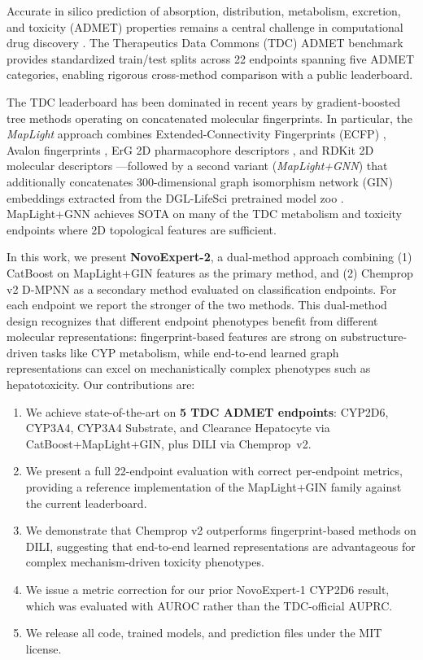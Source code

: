 \documentclass[11pt]{article}
\begin{document}
Accurate in silico prediction of absorption, distribution, metabolism, excretion, and toxicity (ADMET) properties remains a central challenge in computational drug discovery \citep{kola2004can, ferreira2019admet}. The Therapeutics Data Commons (TDC) ADMET benchmark \citep{huang2021therapeutics} provides standardized train/test splits across 22 endpoints spanning five ADMET categories, enabling rigorous cross-method comparison with a public leaderboard.

The TDC leaderboard has been dominated in recent years by gradient-boosted tree methods operating on concatenated molecular fingerprints. In particular, the \emph{MapLight} approach \citep{notwell2023maplight} combines Extended-Connectivity Fingerprints (ECFP) \citep{rogers2010extended}, Avalon fingerprints \citep{gedeck2006qsar}, ErG 2D pharmacophore descriptors \citep{stiefl2006erg}, and RDKit 2D molecular descriptors \citep{landrum2013rdkit}---followed by a second variant (\emph{MapLight+GNN}) that additionally concatenates 300-dimensional graph isomorphism network (GIN) embeddings \citep{xu2019gin, hu2020gin} extracted from the DGL-LifeSci pretrained model zoo \citep{li2021dgllife}. MapLight+GNN achieves SOTA on many of the TDC metabolism and toxicity endpoints where 2D topological features are sufficient.

In this work, we present \textbf{NovoExpert-2}, a dual-method approach combining (1) CatBoost \citep{prokhorenkova2018catboost} on MapLight+GIN features as the primary method, and (2) Chemprop v2 D-MPNN \citep{yang2019analyzing} as a secondary method evaluated on classification endpoints. For each endpoint we report the stronger of the two methods. This dual-method design recognizes that different endpoint phenotypes benefit from different molecular representations: fingerprint-based features are strong on substructure-driven tasks like CYP metabolism, while end-to-end learned graph representations can excel on mechanistically complex phenotypes such as hepatotoxicity. Our contributions are:

\begin{enumerate}
    \item We achieve state-of-the-art on \textbf{5 TDC ADMET endpoints}: CYP2D6, CYP3A4, CYP3A4 Substrate, and Clearance Hepatocyte via CatBoost{+}MapLight{+}GIN, plus DILI via Chemprop~v2.
    \item We present a full 22-endpoint evaluation with correct per-endpoint metrics, providing a reference implementation of the MapLight+GIN family against the current leaderboard.
    \item We demonstrate that Chemprop v2 outperforms fingerprint-based methods on DILI, suggesting that end-to-end learned representations are advantageous for complex mechanism-driven toxicity phenotypes.
    \item We issue a metric correction for our prior NovoExpert-1 CYP2D6 result, which was evaluated with AUROC rather than the TDC-official AUPRC.
    \item We release all code, trained models, and prediction files under the MIT license.
\end{enumerate}
\end{document}
